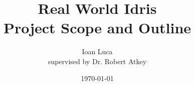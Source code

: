 \documentclass[a4paper]{report}
\begin{document}
\title{Real World Idris \\ Project Scope and Outline}
\author{Ioan Luca \\ \small supervised by Dr. Robert Atkey} %
\date{\today}
\maketitle


\tableofcontents



\end{document}
